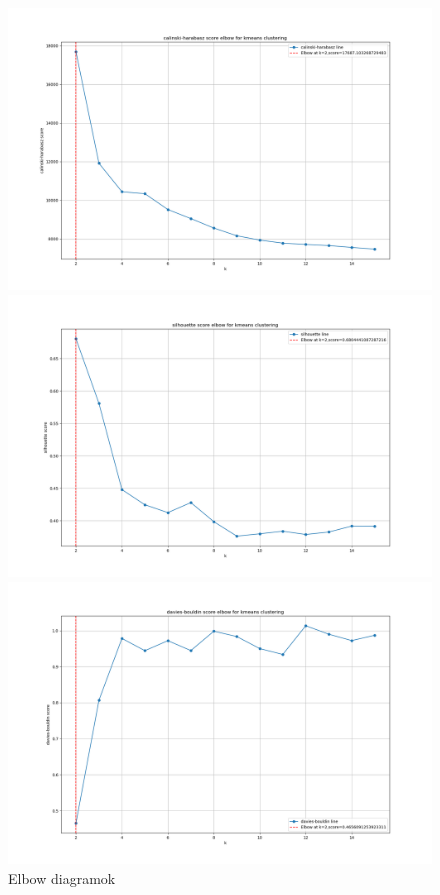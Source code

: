 \documentclass[acmtog, authorversion]{acmart}
\begin{document}
\begin{figure}
    \includegraphics[width=1\columnwidth]{elbow/elbow_on_kmeans_2-16_metric_calinski-harabasz_thresh_0.5.png}

    \includegraphics[width=1\columnwidth]{elbow/elbow_on_kmeans_2-16_metric_silhouette_thresh_0.5.png}

    \includegraphics[width=1\columnwidth]{elbow/elbow_on_kmeans_2-16_metric_davies-bouldin_thresh_0.5.png}
    
    \caption{Elbow diagramok}
    \label{fig: Elbow diagramok}
\end{figure}
\end{document}

